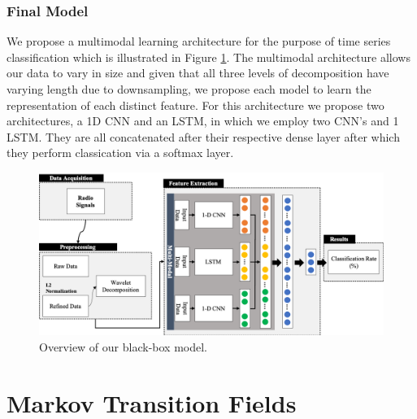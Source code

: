 \documentclass{turabian-thesis}
\begin{document}
\subsection{Final Model}

We propose a multimodal learning architecture for the purpose of time series classification which is illustrated in Figure \ref{fig:multimodal_overview}. The multimodal architecture allows our data to vary in size and given that all three levels of decomposition have varying length due to downsampling, we propose each model to learn the representation of each distinct feature. For this architecture we propose two architectures, a 1D CNN and an LSTM, in which we employ two CNN’s and 1 LSTM. They are all concatenated after their respective dense layer after which they perform classication via a softmax layer. 

\begin{figure}[h!]
   \begin{center}
      \includegraphics[scale=0.6]{../media/multimodal_overview.png}
   \end{center}
   \caption{Overview of our black-box model.}
   \label{fig:multimodal_overview}
\end{figure}






 
\chapter{Markov Transition Fields}
\label{chap:mtf}
\end{document}
